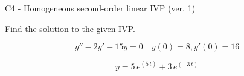 \begin{exercise}
  \begin{exerciseTitle}C4 - Homogeneous second-order linear IVP (ver. 1)\end{exerciseTitle}
  \begin{exerciseStatement}
    
Find the solution to the given IVP.

    
\[y''-2y'-15y = 0 \hspace{1em} y(0) = 8 , y'(0) = 16\]

  \end{exerciseStatement}
  \begin{exerciseAnswer}
    
\[y= 5 \, e^{\left(5 \, t\right)} + 3 \, e^{\left(-3 \, t\right)}\]

  \end{exerciseAnswer}
\end{exercise}
